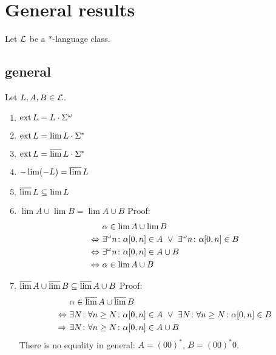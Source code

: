 \section{General results}
\label{general-results}


Let $\mathcal{L}$ be a $*$-language class.

\subsection{general}
\label{gen:general}
Let $L,A,B \in \mathcal{L}$.
\begin{enumerate}
\item $\operatorname{ext} L = L \cdot \Sigma^\omega$
\item $\operatorname{ext} L = \lim L \cdot \Sigma^*$ %
\item $\operatorname{ext} L = \operatorname{\overline{lim}} L \cdot \Sigma^*$ %
\item $- \lim(-L) = \operatorname{\overline{lim}} L$
\item $\operatorname{\overline{lim}} L \subseteq \lim L$
\item $\lim A \cup \lim B = \lim A \cup B$ \newline %
Proof:
\begin{align*}
& \alpha \in \lim A \cup \lim B \\
\Leftrightarrow \ & \existsinf n \colon \alpha[0,n] \in A \ \vee \ \existsinf n \colon \alpha[0,n] \in B \\
\Leftrightarrow \ & \existsinf n \colon \alpha[0,n] \in A \cup B \\
\Leftrightarrow \ & \alpha \in \lim A \cup B
\end{align*}
\item $\operatorname{\overline{lim}} A \cup \operatorname{\overline{lim}} B \subseteq \operatorname{\overline{lim}} A \cup B$ \newline %
Proof:
\begin{align*}
& \alpha \in \dlim A \cup \dlim B \\
\Leftrightarrow \ & \exists N \colon \forall n \ge N \colon \alpha[0,n] \in A \ \vee \ 
\exists N \colon \forall n \ge N \colon \alpha[0,n] \in B \\
\Rightarrow \ & \exists N \colon \forall n \ge N \colon \alpha[0,n] \in A \cup B
\end{align*}
There is no equality in general: $A = (00)^*$, $B = (00)^*0$.
\end{enumerate}

